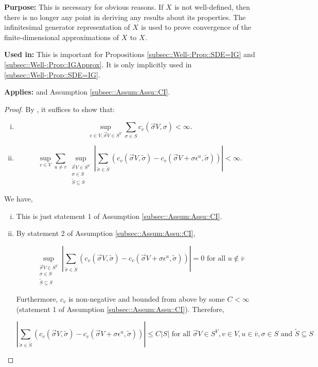 \documentclass[12pt]{article}
\newcommand{\ov}{\overline}
\newcommand{\te}{\text}
\newcommand{\ep}{\epsilon}
\newcommand{\purpose}{\textbf{Purpose: }}
\newcommand{\usein}{\textbf{Used in: }}
\newcommand{\app}{\textbf{Applies: }}
\renewcommand{\v}{v}							%
\newcommand{\vv}{u}								%
\renewcommand{\S}{S}							%
\newcommand{\s}{\sigma}							%
\newcommand{\sv}{\vec{\s}}						%
\newcommand{\ev}[1]{\ep^{#1}}					%
\newcommand{\cl}{\ov}							%
\renewcommand{\ss}[1]{^{#1}}					%
\renewcommand{\SS}{\tilde{\S}}						%
\renewcommand{\ss}{\tilde{\s}}					%
\newcommand{\V}{V}									%
\newcommand{\XState}[1]{\S^{#1}}				%
\newcommand{\rxvts}[2]{X_{#1}{#2}}					%
\newcommand{\IGr}[1]{c_{#1}}						%
\newcommand{\const}[1]{C_{#1}}						%
\begin{document}
\purpose This is necessary for obvious reasons. If \(\rxvts{}{}\) is not well-defined, then there is no longer any point in deriving any results about its properties. The infinitesimal generator representation of \(\rxvts{}{}\) is used to prove convergence of the finite-dimensional approximations of \(\rxvts{}{}\) to \(\rxvts{}{}\).

\usein This is important for Propositions \ref{subsec::Well-:Prop::SDE=IG} and \ref{subsec::Well-:Prop::IGApprox}. It is only implicitly used in \ref{subsec::Well-:Prop::SDE=IG}.

\app \cite[Theorem 3.9]{Lig85} and Assumption \ref{subsec::Assum:Assu::CI}.

\begin{proof}
By \cite[Theorem 3.9 (a) and (b)]{Lig85}, it suffices to show that:

\begin{enumerate}[i)]
\item 

\[\sup_{\v \in \V,\sv{}{\V} \in \S^\V} \sum_{\s \in \S} \IGr{\v}(\sv{}{\V},\s) < \infty.\]

\item 

\[\sup_{\v\in \V}\sum_{\vv\neq \v} \sup_{\substack{\sv{}{\V} \in \S^\V\\ \s\in \S\\ \SS \subseteq \S}} \left|\sum_{\ss \in \SS} (\IGr{\v}(\sv{}{\V},\ss) - \IGr{\v}(\sv{}{\V}+\s \ev{\vv},\ss))\right| < \infty.\]
\end{enumerate}

We have,

\begin{enumerate}[i)]
\item This is just statement 1 of Assumption \ref{subsec::Assum:Assu::CI}.

\item By statement 2 of Assumption \ref{subsec::Assum:Assu::CI}, 

\[\sup_{\substack{\sv{}{\V} \in \S^\V\\ \s\in \S\\ \SS\subseteq \S}} \left|\sum_{\ss \in \SS} (\IGr{\v}(\sv{}{\V},\ss) - \IGr{\v}(\sv{}{\V}+\s \ev{\vv},\ss))\right| = 0 \te{ for all } \vv \notin \cl{\v}\]

Furthermore, \(\IGr{\v}\) is non-negative and bounded from above by some \(\const{} < \infty\) (statement 1 of Assumption \ref{subsec::Assum:Assu::CI}). Therefore, 

\[\left|\sum_{\ss \in \SS} (\IGr{\v}(\sv{}{\V},\ss) - \IGr{\v}(\sv{}{\V}+\s\ev{\vv},\ss))\right| \leq \const{}|\S| \te{ for all } \sv{}{\V} \in \S^\V,\v \in \V, \vv \in \cl{\v}, \s \in \S \te{ and } \SS\subseteq \S\]


\end{enumerate}
\end{proof}
\end{document}
